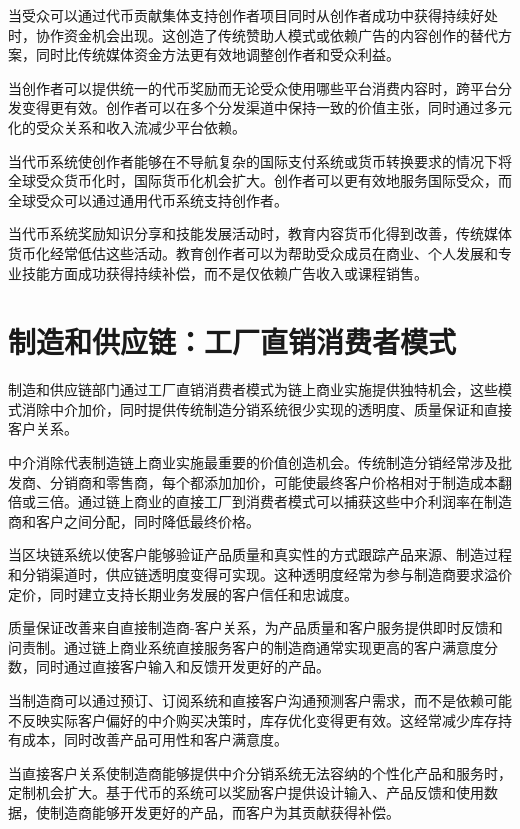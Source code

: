 \documentclass[
  Letterpaper,
]{scrbook}
\begin{document}
当受众可以通过代币贡献集体支持创作者项目同时从创作者成功中获得持续好处时，协作资金机会出现。这创造了传统赞助人模式或依赖广告的内容创作的替代方案，同时比传统媒体资金方法更有效地调整创作者和受众利益。

当创作者可以提供统一的代币奖励而无论受众使用哪些平台消费内容时，跨平台分发变得更有效。创作者可以在多个分发渠道中保持一致的价值主张，同时通过多元化的受众关系和收入流减少平台依赖。

当代币系统使创作者能够在不导航复杂的国际支付系统或货币转换要求的情况下将全球受众货币化时，国际货币化机会扩大。创作者可以更有效地服务国际受众，而全球受众可以通过通用代币系统支持创作者。

当代币系统奖励知识分享和技能发展活动时，教育内容货币化得到改善，传统媒体货币化经常低估这些活动。教育创作者可以为帮助受众成员在商业、个人发展和专业技能方面成功获得持续补偿，而不是仅依赖广告收入或课程销售。

\section{制造和供应链：工厂直销消费者模式}\label{ux5236ux9020ux548cux4f9bux5e94ux94feux5de5ux5382ux76f4ux9500ux6d88ux8d39ux8005ux6a21ux5f0f}

制造和供应链部门通过工厂直销消费者模式为链上商业实施提供独特机会，这些模式消除中介加价，同时提供传统制造分销系统很少实现的透明度、质量保证和直接客户关系。

中介消除代表制造链上商业实施最重要的价值创造机会。传统制造分销经常涉及批发商、分销商和零售商，每个都添加加价，可能使最终客户价格相对于制造成本翻倍或三倍。通过链上商业的直接工厂到消费者模式可以捕获这些中介利润率在制造商和客户之间分配，同时降低最终价格。

当区块链系统以使客户能够验证产品质量和真实性的方式跟踪产品来源、制造过程和分销渠道时，供应链透明度变得可实现。这种透明度经常为参与制造商要求溢价定价，同时建立支持长期业务发展的客户信任和忠诚度。

质量保证改善来自直接制造商-客户关系，为产品质量和客户服务提供即时反馈和问责制。通过链上商业系统直接服务客户的制造商通常实现更高的客户满意度分数，同时通过直接客户输入和反馈开发更好的产品。

当制造商可以通过预订、订阅系统和直接客户沟通预测客户需求，而不是依赖可能不反映实际客户偏好的中介购买决策时，库存优化变得更有效。这经常减少库存持有成本，同时改善产品可用性和客户满意度。

当直接客户关系使制造商能够提供中介分销系统无法容纳的个性化产品和服务时，定制机会扩大。基于代币的系统可以奖励客户提供设计输入、产品反馈和使用数据，使制造商能够开发更好的产品，而客户为其贡献获得补偿。
\end{document}
